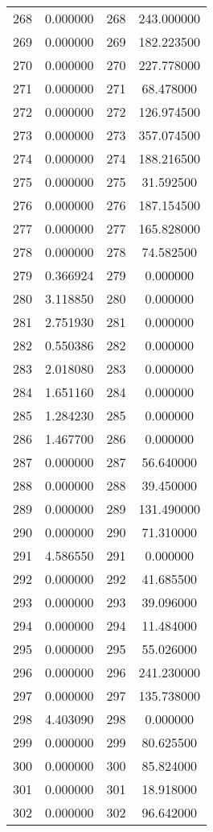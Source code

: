 \documentclass[12pt]{article}
\begin{document}
\begin{longtable}{@{}cccc@{}}
268 & 0.000000 & 268 & 243.000000 \\
269 & 0.000000 & 269 & 182.223500 \\
270 & 0.000000 & 270 & 227.778000 \\
271 & 0.000000 & 271 & 68.478000 \\
272 & 0.000000 & 272 & 126.974500 \\
273 & 0.000000 & 273 & 357.074500 \\
274 & 0.000000 & 274 & 188.216500 \\
275 & 0.000000 & 275 & 31.592500 \\
276 & 0.000000 & 276 & 187.154500 \\
277 & 0.000000 & 277 & 165.828000 \\
278 & 0.000000 & 278 & 74.582500 \\
279 & 0.366924 & 279 & 0.000000 \\
280 & 3.118850 & 280 & 0.000000 \\
281 & 2.751930 & 281 & 0.000000 \\
282 & 0.550386 & 282 & 0.000000 \\
283 & 2.018080 & 283 & 0.000000 \\
284 & 1.651160 & 284 & 0.000000 \\
285 & 1.284230 & 285 & 0.000000 \\
286 & 1.467700 & 286 & 0.000000 \\
287 & 0.000000 & 287 & 56.640000 \\
288 & 0.000000 & 288 & 39.450000 \\
289 & 0.000000 & 289 & 131.490000 \\
290 & 0.000000 & 290 & 71.310000 \\
291 & 4.586550 & 291 & 0.000000 \\
292 & 0.000000 & 292 & 41.685500 \\
293 & 0.000000 & 293 & 39.096000 \\
294 & 0.000000 & 294 & 11.484000 \\
295 & 0.000000 & 295 & 55.026000 \\
296 & 0.000000 & 296 & 241.230000 \\
297 & 0.000000 & 297 & 135.738000 \\
298 & 4.403090 & 298 & 0.000000 \\
299 & 0.000000 & 299 & 80.625500 \\
300 & 0.000000 & 300 & 85.824000 \\
301 & 0.000000 & 301 & 18.918000 \\
302 & 0.000000 & 302 & 96.642000 \\

\end{longtable}
\end{document}
